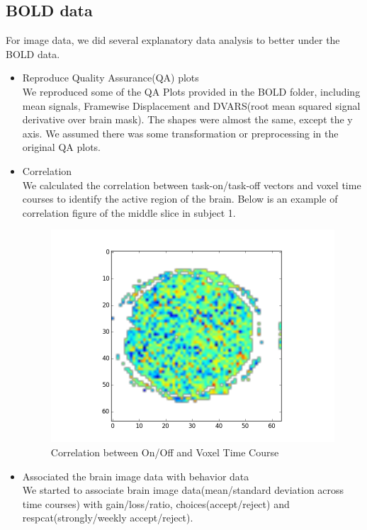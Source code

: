 \subsection{BOLD data}
For image data, we did several explanatory data analysis to better under the 
BOLD data. 
\begin{itemize}
\item Reproduce Quality Assurance(QA) plots\\
 We reproduced some of the QA Plots provided in the BOLD folder, including 
 mean signals, Framewise Displacement and DVARS(root mean squared signal 
 derivative over brain mask). The shapes were almost the same, except the y 
 axis. We assumed there was some transformation or preprocessing in the 
 original QA plots.
\item Correlation \\
 We calculated the correlation between task-on/task-off vectors and voxel time 
 courses to identify the active region of the brain. Below is an example of correlation figure of the middle slice in subject 1.\\
  \begin{figure}[H]
    \centering
        \includegraphics[scale=0.5]{correlations.png}
    \caption{Correlation between On/Off and Voxel Time Course}
\end{figure}
\item Associated the brain image data with behavior data\\
We started to associate brain image data(mean/standard deviation across time courses) with gain/loss/ratio, choices(accept/reject) and respcat(strongly/weekly accept/reject).
\end {itemize}